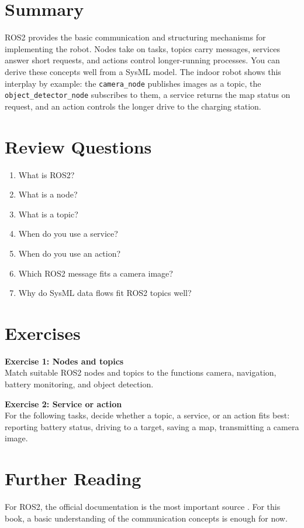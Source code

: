 \section{Summary}
ROS2 provides the basic communication and structuring mechanisms for implementing the robot. Nodes take on tasks, topics carry messages, services answer short requests, and actions control longer-running processes. You can derive these concepts well from a SysML model. The indoor robot shows this interplay by example: the \texttt{camera\_node} publishes images as a topic, the \texttt{object\_detector\_node} subscribes to them, a service returns the map status on request, and an action controls the longer drive to the charging station.

\section{Review Questions}
\begin{enumerate}
    \item What is ROS2?
    \item What is a node?
    \item What is a topic?
    \item When do you use a service?
    \item When do you use an action?
    \item Which ROS2 message fits a camera image?
    \item Why do SysML data flows fit ROS2 topics well?
\end{enumerate}

\section{Exercises}
\begin{uebungbox}
\textbf{Exercise 1: Nodes and topics}\\
Match suitable ROS2 nodes and topics to the functions camera, navigation, battery monitoring, and object detection.
\end{uebungbox}

\begin{uebungbox}
\textbf{Exercise 2: Service or action}\\
For the following tasks, decide whether a topic, a service, or an action fits best: reporting battery status, driving to a target, saving a map, transmitting a camera image.
\end{uebungbox}

\section{Further Reading}
For ROS2, the official documentation is the most important source \cite{ros2docs}. For this book, a basic understanding of the communication concepts is enough for now.
